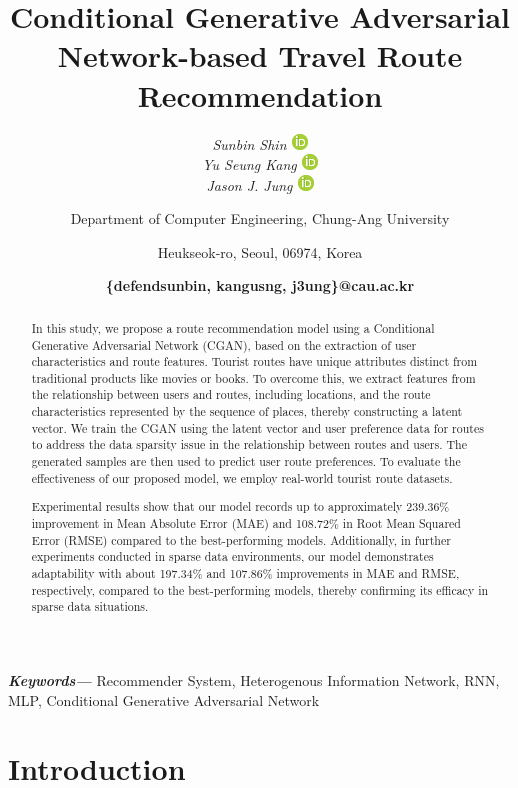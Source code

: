 \documentclass[]{article}
\title{Conditional Generative Adversarial Network-based Travel Route Recommendation}
\author{
	\textit{Sunbin Shin \href{https://orcid.org/0009-0001-9440-5249}{\includegraphics[scale=0.5]{fig/ORCIDiD_icon16x16.png}}} \\
	\textit{Yu Seung Kang \href{https://orcid.org/0009-0000-1465-4097}{\includegraphics[scale=0.5]{fig/ORCIDiD_icon16x16.png}}} \\
	\textit{Jason J. Jung \href{https://orcid.org/0000-0003-0050-7445}{\includegraphics[scale=0.5]{fig/ORCIDiD_icon16x16.png}}} \\ \and \newline 
	Department of Computer Engineering, Chung-Ang University \and \newline 84 Heukseok-ro, Seoul, 06974, Korea \and
	\textbf{\{defendsunbin, kangusng, j3ung\}@cau.ac.kr}
}
\providecommand{\keywords}[1]
{
	\small	
	\textbf{\textit{Keywords---}} #1
}
\begin{document}
	
	\maketitle

\begin{abstract}
In this study, we propose a route recommendation model using a Conditional Generative Adversarial Network (CGAN), based on the extraction of user characteristics and route features. Tourist routes have unique attributes distinct from traditional products like movies or books. To overcome this, we extract features from the relationship between users and routes, including locations, and the route characteristics represented by the sequence of places, thereby constructing a latent vector. We train the CGAN using the latent vector and user preference data for routes to address the data sparsity issue in the relationship between routes and users. The generated samples are then used to predict user route preferences. To evaluate the effectiveness of our proposed model, we employ real-world tourist route datasets. 

Experimental results show that our model records up to approximately 239.36\% improvement in Mean Absolute Error (MAE) and 108.72\% in Root Mean Squared Error (RMSE) compared to the best-performing models. Additionally, in further experiments conducted in sparse data environments, our model demonstrates adaptability with about 197.34\% and 107.86\% improvements in MAE and RMSE, respectively, compared to the best-performing models, thereby confirming its efficacy in sparse data situations.
\end{abstract}

\keywords{Recommender System, Heterogenous Information Network, RNN, MLP, Conditional Generative Adversarial Network}

\section{Introduction}
\label{sec:Intro}
\end{document}
